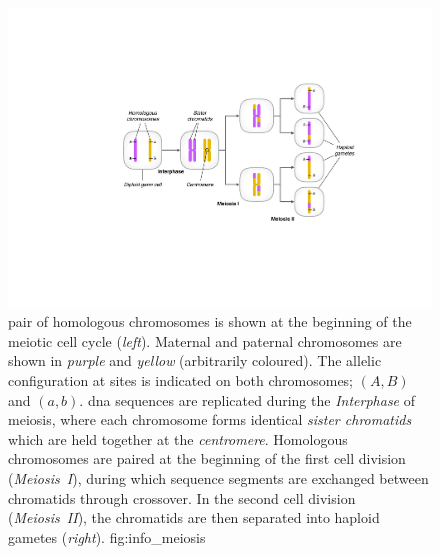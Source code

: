 

\begin{figure}[!htb]
\centering
\includegraphics[width=\textwidth]{./img/ch1/info_meiosis}
{ pair of homologous chromosomes is shown at the beginning of the meiotic cell cycle (\emph{left}).
Maternal and paternal chromosomes are shown in \emph{purple} and \emph{yellow} (arbitrarily coloured).
The allelic configuration at  sites is indicated on both chromosomes; $(A,B)$ and $(a,b)$.
\Gls{dna} sequences are replicated during the \emph{Interphase} of meiosis, where each chromosome forms  identical \emph{sister chromatids} which are held together at the \emph{centromere}.
Homologous chromosomes are paired at the beginning of the first cell division (\emph{Meiosis~I}), during which sequence segments are exchanged between chromatids through crossover.
In the second cell division (\emph{Meiosis~II}), the  chromatids are then separated into haploid gametes (\emph{right}).}
{fig:info_meiosis}
\end{figure}

